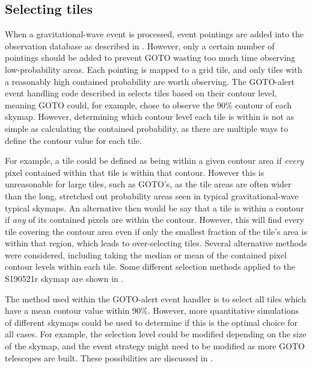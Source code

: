 \subsection{Selecting tiles}
\label{sec:selecting_tiles}
\begin{colsection}

When a gravitational-wave event is processed, event pointings are added into the observation database as described in . However, only a certain number of pointings should be added to prevent GOTO wasting too much time observing low-probability areas. Each pointing is mapped to a grid tile, and only tiles with a reasonably high contained probability are worth observing. The GOTO-alert event handling code described in  selects tiles based on their contour level, meaning GOTO could, for example, chose to observe the 90\% contour of each skymap. However, determining which contour level each tile is within is not as simple as calculating the contained probability, as there are multiple ways to define the contour value for each tile.

For example, a tile could be defined as being within a given contour area if \textit{every} pixel contained within that tile is within that contour. However this is unreasonable for large tiles, such as GOTO's, as the tile areas are often wider than the long, stretched out probability areas seen in typical gravitational-wave typical skymaps. An alternative then would be say that a tile is within a contour if \textit{any} of its contained pixels are within the contour. However, this will find every tile covering the contour area even if only the smallest fraction of the tile's area is within that region, which leads to over-selecting tiles. Several alternative methods were considered, including taking the median or mean of the contained pixel contour levels within each tile. Some different selection methods applied to the S190521r skymap are shown in .

The method used within the GOTO-alert event handler is to select all tiles which have a mean contour value within 90\%. However, more quantitative simulations of different skymaps could be used to determine if this is the optimal choice for all cases. For example, the selection level could be modified depending on the size of the skymap, and the event strategy might need to be modified as more GOTO telescopes are built. These possibilities are discussed in .


\end{colsection}
